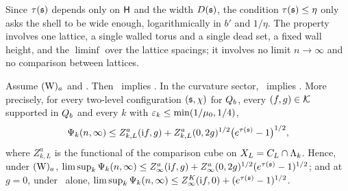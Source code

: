 Since $\tau(\mathfrak s)$ depends only on $\mathsf H$ and the width $D(\mathfrak s)$, the condition $\tau(\mathfrak s)\le\eta$ only asks the shell to be wide enough, logarithmically in $b'$ and $1/\eta$. The property involves one lattice, a single walled torus and a single dead set, a fixed wall height, and the $\liminf$ over the lattice spacings; it involves no limit $n\to\infty$ and no comparison between lattices.

\begin{theorem}\label{rot:thm:SHtoTIGHT}
Assume $(\mathrm W)_{a}$ and \Ka. Then \SHa\ implies \TIa. In the curvature sector, \SHz\ implies \TIz. More precisely, for every two-level configuration $(\mathfrak s,\chi)$ for $Q_{b}$, every $(f,g)\in\mathcal K$ supported in $Q_{b}$ and every $k$ with $\varepsilon_k\le\min(1/\mu_0,1/4)$,
\begin{equation}\label{rot:eq:deadbound}
\Psi_k(n,\infty)\le Z^a_{k,L}(\mathrm if,g)+Z^a_{k,L}(0,2g)^{1/2}\big(e^{\tau(\mathfrak s)}-1\big)^{1/2},
\end{equation}
where $Z^a_{k,L}$ is the functional of the comparison cube on $X_L=C_L\cap\Lambda_k$. Hence, under $(\mathrm W)_{a}$, $\limsup_k\Psi_k(n,\infty)\le Z^a_\infty(\mathrm if,g)+Z^a_\infty(0,2g)^{1/2}(e^{\tau(\mathfrak s)}-1)^{1/2}$; and at $g=0$, under \EC\ alone, $\limsup_k\Psi_k(n,\infty)\le Z^{K}_{\infty}(\mathrm if,0)+(e^{\tau(\mathfrak s)}-1)^{1/2}$.
\end{theorem}

